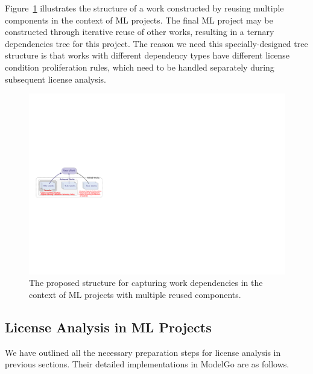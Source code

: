 Figure~\ref{fig:stru} illustrates the structure of a work constructed by reusing multiple components in the context of ML projects.
The final ML project may be constructed through iterative reuse of other works, resulting in a ternary dependencies tree for this project.
The reason we need this specially-designed tree structure is that works with different dependency types have different license condition proliferation rules, which need to be handled separately during subsequent license analysis. 


\begin{figure}[t]
    \centering
    \includegraphics[width=\linewidth]{fig/structure.pdf}
    \caption{The proposed structure for capturing work dependencies in the context of ML projects with multiple reused components.}
    \Description{}
    \label{fig:stru}
\end{figure}

\subsection{License Analysis in ML Projects}

We have outlined all the necessary preparation steps for license analysis in previous sections.
Their detailed implementations in ModelGo are as follows.

